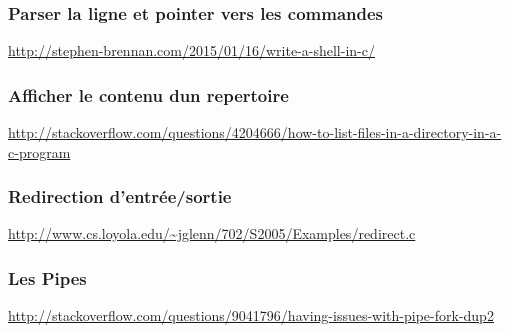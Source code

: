 \documentclass{article}
\begin{document}
\subsubsection*{Parser la ligne et pointer vers les commandes} \url{http://stephen-brennan.com/2015/01/16/write-a-shell-in-c/}
\subsubsection*{Afficher le contenu dun repertoire}
\url{http://stackoverflow.com/questions/4204666/how-to-list-files-in-a-directory-in-a-c-program}

\subsubsection*{Redirection d'entrée/sortie}
\url{http://www.cs.loyola.edu/~jglenn/702/S2005/Examples/redirect.c}

\subsubsection*{Les Pipes}
\url{http://stackoverflow.com/questions/9041796/having-issues-with-pipe-fork-dup2}
\end{document}
